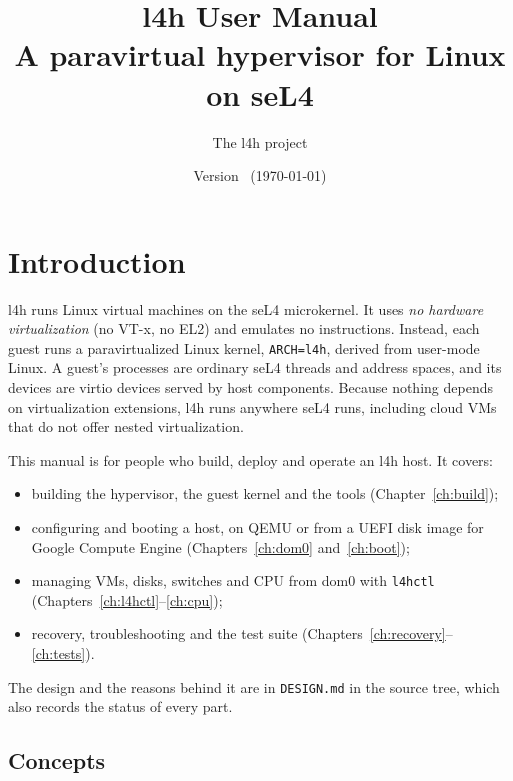 \documentclass[11pt,a4paper]{report}
\title{\Huge l4h User Manual\\[0.5em]\Large A paravirtual hypervisor for Linux on seL4}
\author{The l4h project}
\date{Version \lfourhversion\ (\today)}
\newcommand{\cmd}[1]{\texttt{#1}}
\newcommand{\file}[1]{\texttt{#1}}
\begin{document}
\maketitle
\tableofcontents

\chapter{Introduction}

l4h runs Linux virtual machines on the seL4 microkernel. It uses
\emph{no hardware virtualization} (no VT-x, no EL2) and emulates no
instructions. Instead, each guest runs a paravirtualized Linux kernel,
\texttt{ARCH=l4h}, derived from user-mode Linux. A guest's processes are
ordinary seL4 threads and address spaces, and its devices are virtio devices
served by host components. Because nothing depends on virtualization
extensions, l4h runs anywhere seL4 runs, including cloud VMs that do not
offer nested virtualization.

This manual is for people who build, deploy and operate an l4h host. It
covers:
\begin{itemize}
  \item building the hypervisor, the guest kernel and the tools
        (Chapter~\ref{ch:build});
  \item configuring and booting a host, on QEMU or from a UEFI disk image
        for Google Compute Engine (Chapters~\ref{ch:dom0} and~\ref{ch:boot});
  \item managing VMs, disks, switches and CPU from dom0 with \cmd{l4hctl}
        (Chapters~\ref{ch:l4hctl}--\ref{ch:cpu});
  \item recovery, troubleshooting and the test suite
        (Chapters~\ref{ch:recovery}--\ref{ch:tests}).
\end{itemize}
The design and the reasons behind it are in \file{DESIGN.md} in the source
tree, which also records the status of every part.

\section{Concepts}
\end{document}
